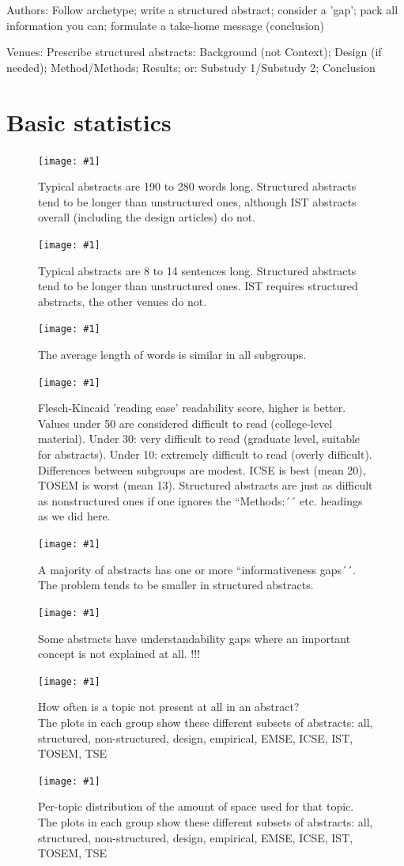 \documentclass[10pt,journal,compsoc]{IEEEtran}
\newcommand{\Plot}[2]{%
	\begin{figure}[!t]%
		\centering\texttt{[image: \#1]}%
		\vspace{-4mm}\caption{#2}\label{#1}%
	\end{figure}}
\newcommand{\Plotwide}[2]{%
	\begin{figure}%
		\centering\texttt{[image: \#1]}%
		\vspace{-4mm}\caption{#2}\label{#1}%
    \end{figure}}
\begin{document}
\noindent
Authors: Follow archetype; write a structured abstract; consider a 'gap'; pack all information you can; formulate a take-home message (conclusion)

Venues: Prescribe structured abstracts: Background (not Context); Design (if needed); Method/Methods; Results; or: Substudy 1/Substudy 2; Conclusion



\appendix
\section{Basic statistics}

\Plot{boxplots_words}{%
  Typical abstracts are 190 to 280 words long. 
  Structured abstracts tend to be longer than unstructured ones, 
  although IST abstracts overall (including the design articles) do not.}
\Plot{boxplots_sentences}{%
	Typical abstracts are 8 to 14 sentences long.
	Structured abstracts tend to be longer than unstructured ones.
	IST requires structured abstracts, the other venues do not.}
\Plot{boxplots_avg_wordlength}{%
	The average length of words is similar in all subgroups.}
\Plot{boxplots_fkscore}{%
	Flesch-Kincaid 'reading ease' readability score, higher is better.
    Values under 50 are considered difficult to read (college-level material).
    Under 30: very difficult to read (graduate level, suitable for abstracts).
	Under 10: extremely difficult to read (overly difficult).
    Differences between subgroups are modest. 
	ICSE is best (mean 20), TOSEM is worst (mean 13).
    Structured abstracts are just as difficult as nonstructured ones
    if one ignores the ``Methods:´´ etc. headings as we did here.
}
\Plot{boxplots_icount}{%
  A majority of abstracts has one or more ``informativeness gaps´´.
  The problem tends to be smaller in structured abstracts.}
\Plot{boxplots_ucount}{%
  Some abstracts have understandability gaps where an important concept is not explained at all.
  !!!}
\Plotwide{zerofractionbar_xletgroups_topicmissingfractions}{%
	How often is a topic not present at all in an abstract?\\
	The plots in each group show these different subsets of abstracts:
	all, structured, non-structured, design, empirical, EMSE, ICSE, IST, TOSEM, TSE}
\Plotwide{box_xletgroups_topicfractions}{%
	Per-topic distribution of the amount of space used for that topic.\\
	The plots in each group show these different subsets of abstracts:
	all, structured, non-structured, design, empirical, EMSE, ICSE, IST, TOSEM, TSE}
\end{document}
